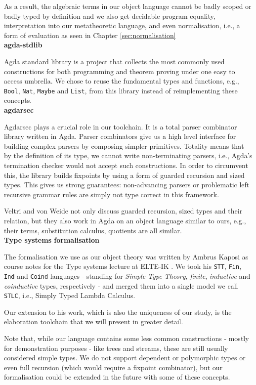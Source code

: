 As a result, the algebraic terms in our object language cannot be badly scoped or badly typed by definition and we also get decidable program equality, interpretation into our metatheoretic language, and even normalisation, i.e., a form of evaluation as seen in Chapter \ref{sec:normalisation}\\

\noindent\textbf{agda-stdlib}

Agda standard library \cite{The_Agda_Community_Agda_Standard_Library_2023} is a project that collects the most commonly used constructions for both programming and theorem proving under one easy to access umbrella. We chose to reuse the fundamental types and functions, e.g., \verb$Bool$, \verb$Nat$, \verb$Maybe$ and \verb$List$, from this library instead of reimplementing these concepts.\\

\noindent\textbf{agdarsec}

Agdarsec \cite{allais2018agdarsec} plays a crucial role in our toolchain. It is a total parser combinator library written in Agda. Parser combinators give us a high level interface for building complex parsers by composing simpler primitives. Totality means that by the definition of its type, we cannot write non-terminating parsers, i.e., Agda's termination checker would not accept such constructions. In order to circumvent this, the library builds fixpoints by using a form of guarded recursion and sized types. This gives us strong guarantees: non-advancing parsers or problematic left recursive grammar rules are simply not type correct in this framework.

Veltri and von Weide \cite{veltri2019guarded} not only discuss guarded recursion, sized types and their relation, but they also work in Agda on an object language similar to ours, e.g., their terms, substitution calculus, quotients are all similar.\\

\noindent\textbf{Type systems formalisation}

The formalisation we use as our object theory was written by Ambrus Kaposi as course notes for the Type systems lecture at ELTE-IK \cite{typesystems-repo}. We took his \verb$STT$, \verb$Fin$, \verb$Ind$ and \verb$Coind$ languages - standing for \textit{Simple Type Theory}, \textit{finite}, \textit{inductive} and \textit{coinductive} types, respectively - and merged them into a single model we call \verb$STLC$, i.e., Simply Typed Lambda Calculus.

Our extension to his work, which is also the uniqueness of our study, is the elaboration toolchain \cite{godelTalk} that we will present in greater detail.

Note that, while our language contains some less common constructions - mostly for demonstration purposes - like trees and streams, these are still usually considered simple types. We do not support dependent or polymorphic types or even full recursion (which would require a fixpoint combinator), but our formalisation could be extended in the future with some of these concepts.

